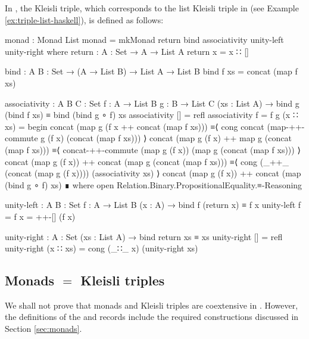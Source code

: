 \begin{example}
  \label{ex:triple-list-agda}

  In \agda, the  Kleisli triple, which corresponds to
  the list Kleisli triple in \hask (see Example
  \ref{ex:triple-list-haskell}), is defined as follows:
  \begin{codeagda}
monad : Monad List
monad = mkMonad return bind associativity unity-left unity-right
  where
    return : {A : Set} → A → List A
    return x = x ∷ []

    bind : {A B : Set} → (A → List B) → List A → List B
    bind f xs = concat (map f xs)

    associativity : {A B C : Set} {f : A → List B} {g : B → List C}
                    (xs : List A) →
                    bind g (bind f xs) ≡ bind (bind g ∘ f) xs
    associativity             []       = refl
    associativity {f = f} {g} (x ∷ xs) =
      begin
        concat (map g (f x ++ concat (map f xs)))
          ≡⟨ cong concat (map-++-commute g (f x)
               (concat (map f xs))) ⟩
        concat (map g (f x) ++ map g (concat (map f xs)))
          ≡⟨ concat-++-commute (map g (f x))
               (map g (concat (map f xs))) ⟩
        concat (map g (f x)) ++ concat (map g (concat (map f xs)))
          ≡⟨ cong (_++_ (concat (map g (f x)))) (associativity xs) ⟩
        concat (map g (f x)) ++ concat (map (bind g ∘ f) xs)
      ∎
        where open Relation.Binary.PropositionalEquality.≡-Reasoning

    unity-left : {A B : Set} {f : A → List B} (x : A) →
                 bind f (return x) ≡ f x
    unity-left {f = f} x = ++-[] (f x)

    unity-right : {A : Set} (xs : List A) → bind return xs ≡ xs
    unity-right []       = refl
    unity-right (x ∷ xs) = cong (_∷_ x) (unity-right xs)
  \end{codeagda}

\end{example}

\subsection*{Monads $=$ Kleisli triples}

We shall not prove that monads and Kleisli triples are coextensive in
\agda. However, the definitions of the  and
 records include the required constructions discussed
in Section \ref{sec:monads}.

